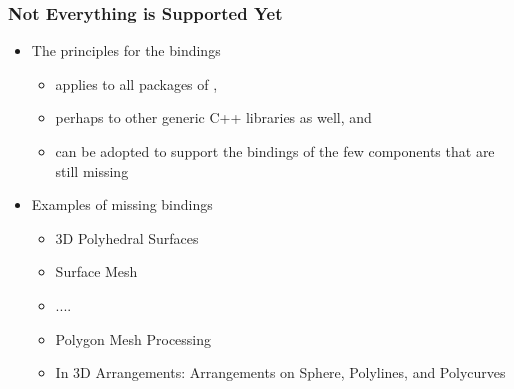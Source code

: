 \begin{frame}[fragile]
  \frametitle{Not Everything is Supported Yet}
  \begin{itemize}
  \item The principles for the bindings
    \begin{itemize}
    \item applies to all packages of \cgal{},
    \item perhaps to other generic C++ libraries as well, and
    \item can be adopted to support the bindings of the few components that
      are still missing
    \end{itemize}
  \item Examples of missing bindings
    \begin{itemize}
    \item 3D Polyhedral Surfaces
    \item Surface Mesh
    \item ....
    \item Polygon Mesh Processing
    \item In 3D Arrangements: Arrangements on Sphere, Polylines, and Polycurves
    \end{itemize}
  \end{itemize}
\end{frame}

